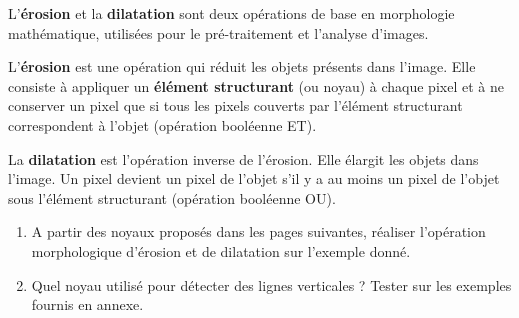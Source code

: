 \documentclass[10pt]{article} %
\begin{document}
L'\textbf{érosion} et la \textbf{dilatation} sont deux opérations de base en morphologie mathématique, utilisées pour le pré-traitement et l'analyse d'images.

\medskip

L'\textbf{érosion} est une opération qui réduit les objets présents dans l'image. Elle consiste à appliquer un \textbf{élément structurant} (ou noyau) à chaque pixel et à ne conserver un pixel que si tous les pixels couverts par l'élément structurant correspondent à l'objet (opération booléenne ET).

La \textbf{dilatation} est l'opération inverse de l'érosion. Elle élargit les objets dans l'image. Un pixel devient un pixel de l'objet s'il y a au moins un pixel de l'objet sous l'élément structurant (opération booléenne OU).


\begin{enumerate}
	\item A partir des noyaux proposés dans les pages suivantes, réaliser l'opération morphologique d'érosion et de dilatation sur l'exemple donné.
	\item Quel noyau utilisé pour détecter des lignes verticales ? Tester sur les exemples fournis en annexe.	
\end{enumerate}


\end{document}
